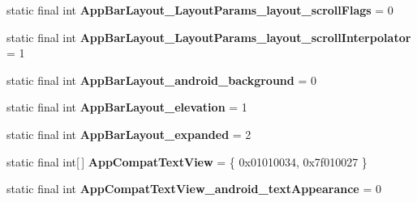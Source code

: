 \begin{DoxyCompactItemize}
\item 
\hypertarget{classandroid_1_1support_1_1design_1_1_r_1_1styleable_ad3c82704bb48ced820bd1428cfb42b02}{}static final int {\bfseries App\+Bar\+Layout\+\_\+\+Layout\+Params\+\_\+layout\+\_\+scroll\+Flags} = 0\label{classandroid_1_1support_1_1design_1_1_r_1_1styleable_ad3c82704bb48ced820bd1428cfb42b02}

\item 
\hypertarget{classandroid_1_1support_1_1design_1_1_r_1_1styleable_a2576537b5631f26a851c50bdcccca190}{}static final int {\bfseries App\+Bar\+Layout\+\_\+\+Layout\+Params\+\_\+layout\+\_\+scroll\+Interpolator} = 1\label{classandroid_1_1support_1_1design_1_1_r_1_1styleable_a2576537b5631f26a851c50bdcccca190}

\item 
\hypertarget{classandroid_1_1support_1_1design_1_1_r_1_1styleable_ae73de4f6a34a79953b359c4b89876a2d}{}static final int {\bfseries App\+Bar\+Layout\+\_\+android\+\_\+background} = 0\label{classandroid_1_1support_1_1design_1_1_r_1_1styleable_ae73de4f6a34a79953b359c4b89876a2d}

\item 
\hypertarget{classandroid_1_1support_1_1design_1_1_r_1_1styleable_aa5bd8cba190544da5bbd7dcf760146ce}{}static final int {\bfseries App\+Bar\+Layout\+\_\+elevation} = 1\label{classandroid_1_1support_1_1design_1_1_r_1_1styleable_aa5bd8cba190544da5bbd7dcf760146ce}

\item 
\hypertarget{classandroid_1_1support_1_1design_1_1_r_1_1styleable_a965848a88c548e64fa7f537bd7cc68fc}{}static final int {\bfseries App\+Bar\+Layout\+\_\+expanded} = 2\label{classandroid_1_1support_1_1design_1_1_r_1_1styleable_a965848a88c548e64fa7f537bd7cc68fc}

\item 
\hypertarget{classandroid_1_1support_1_1design_1_1_r_1_1styleable_a4f8449fe92fa53cd1fd4547247fe52b6}{}static final int\mbox{[}$\,$\mbox{]} {\bfseries App\+Compat\+Text\+View} = \{ 0x01010034, 0x7f010027 \}\label{classandroid_1_1support_1_1design_1_1_r_1_1styleable_a4f8449fe92fa53cd1fd4547247fe52b6}

\item 
\hypertarget{classandroid_1_1support_1_1design_1_1_r_1_1styleable_a209c032caa80f4c43d72cadddbe05ec2}{}static final int {\bfseries App\+Compat\+Text\+View\+\_\+android\+\_\+text\+Appearance} = 0\label{classandroid_1_1support_1_1design_1_1_r_1_1styleable_a209c032caa80f4c43d72cadddbe05ec2}


\end{DoxyCompactItemize}
